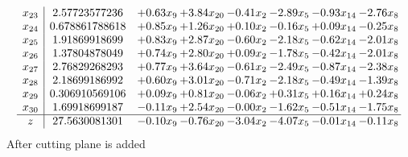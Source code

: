 \documentclass[8pt]{article}
\begin{document}
\[\begin{array}{c| c c@{\hskip 2pt} c@{\hskip 2pt} c@{\hskip 2pt} c@{\hskip 2pt} c@{\hskip 2pt} c@{\hskip 2pt} }
 x_{23}   &  2.57723577236 & +  0.63 x_{9} & +  3.84 x_{20} & -0.41 x_{2} & -2.89 x_{5} & -0.93 x_{14} & -2.76 x_{8}\\
 x_{24}   &  0.678861788618 & +  0.85 x_{9} & +  1.26 x_{20} & +  0.10 x_{2} & -0.16 x_{5} & +  0.09 x_{14} & -0.25 x_{8}\\
 x_{25}   &  1.91869918699 & +  0.83 x_{9} & +  2.87 x_{20} & -0.60 x_{2} & -2.18 x_{5} & -0.62 x_{14} & -2.01 x_{8}\\
 x_{26}   &  1.37804878049 & +  0.74 x_{9} & +  2.80 x_{20} & +  0.09 x_{2} & -1.78 x_{5} & -0.42 x_{14} & -2.01 x_{8}\\
 x_{27}   &  2.76829268293 & +  0.77 x_{9} & +  3.64 x_{20} & -0.61 x_{2} & -2.49 x_{5} & -0.87 x_{14} & -2.38 x_{8}\\
 x_{28}   &  2.18699186992 & +  0.60 x_{9} & +  3.01 x_{20} & -0.71 x_{2} & -2.18 x_{5} & -0.49 x_{14} & -1.39 x_{8}\\
 x_{29}   &  0.306910569106 & +  0.09 x_{9} & +  0.81 x_{20} & -0.06 x_{2} & +  0.31 x_{5} & +  0.16 x_{14} & +  0.24 x_{8}\\
 x_{30}   &  1.69918699187 & -0.11 x_{9} & +  2.54 x_{20} & -0.00 x_{2} & -1.62 x_{5} & -0.51 x_{14} & -1.75 x_{8}\\
\hline
z    &  27.5630081301 & -0.10 x_{9} & -0.76 x_{20} & -3.04 x_{2} & -4.07 x_{5} & -0.01 x_{14} & -0.11 x_{8}\\
\end{array}\]
 After cutting plane is added 
\end{document}
